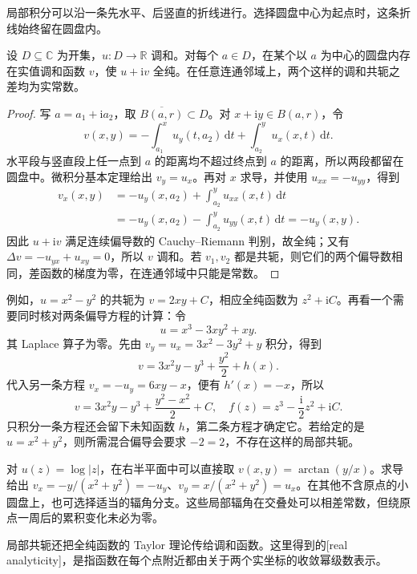 局部积分可以沿一条先水平、后竖直的折线进行。选择圆盘中心为起点时，这条折线始终留在圆盘内。

\begin{proposition}\label{b3:prop:15-local-conjugate}
设 \(D\subseteq\mathbb C\) 为开集，\(u:D\to\mathbb R\) 调和。对每个 \(a\in D\)，在某个以 \(a\) 为中心的圆盘内存在实值调和函数 \(v\)，使 \(u+\mathrm i v\) 全纯。在任意连通邻域上，两个这样的调和共轭之差均为实常数。
\end{proposition}
\begin{proof}
写 \(a=a_1+\mathrm i a_2\)，取 \(\overline{B(a,r)}\subset D\)。对 \(x+\mathrm i y\in B(a,r)\)，令
\[
 v(x,y)=-\int_{a_1}^x u_y(t,a_2)\,\mathrm dt
       +\int_{a_2}^y u_x(x,t)\,\mathrm dt.
\]
水平段与竖直段上任一点到 \(a\) 的距离均不超过终点到 \(a\) 的距离，所以两段都留在圆盘中。微积分基本定理给出 \(v_y=u_x\)。再对 \(x\) 求导，并使用 \(u_{xx}=-u_{yy}\)，得到
\[
 \begin{aligned}
 v_x(x,y)
 &=-u_y(x,a_2)+\int_{a_2}^y u_{xx}(x,t)\,\mathrm dt\\
 &=-u_y(x,a_2)-\int_{a_2}^y u_{yy}(x,t)\,\mathrm dt
 =-u_y(x,y).
 \end{aligned}
\]
因此 \(u+\mathrm i v\) 满足连续偏导数的 Cauchy--Riemann 判别，故全纯；又有
\(\Delta v=-u_{yx}+u_{xy}=0\)，所以 \(v\) 调和。若 \(v_1,v_2\) 都是共轭，则它们的两个偏导数相同，差函数的梯度为零，在连通邻域中只能是常数。
\end{proof}

例如，\(u=x^2-y^2\) 的共轭为 \(v=2xy+C\)，相应全纯函数为 \(z^2+\mathrm i C\)。再看一个需要同时核对两条偏导方程的计算：令
\[
 u=x^3-3xy^2+xy.
\]
其 Laplace 算子为零。先由 \(v_y=u_x=3x^2-3y^2+y\) 积分，得到
\[
 v=3x^2y-y^3+\frac{y^2}{2}+h(x).
\]
代入另一条方程 \(v_x=-u_y=6xy-x\)，便有 \(h'(x)=-x\)，所以
\[
 v=3x^2y-y^3+\frac{y^2-x^2}{2}+C,
 \quad f(z)=z^3-\frac{\mathrm i}{2}z^2+\mathrm i C.
\]
只积分一条方程还会留下未知函数 \(h\)，第二条方程才确定它。若给定的是 \(u=x^2+y^2\)，则所需混合偏导会要求 \(-2=2\)，不存在这样的局部共轭。

\ProseParagraphBreak
对 \(u(z)=\log|z|\)，在右半平面中可以直接取 \(v(x,y)=\arctan(y/x)\)。求导给出 \(v_x=-y/(x^2+y^2)=-u_y\)、\(v_y=x/(x^2+y^2)=u_x\)。在其他不含原点的小圆盘上，也可选择适当的辐角分支。这些局部辐角在交叠处可以相差常数，但绕原点一周后的累积变化未必为零。

\ProseParagraphBreak
局部共轭还把全纯函数的 Taylor 理论传给调和函数。这里得到的[real analyticity]，是指函数在每个点附近都由关于两个实坐标的收敛幂级数表示。

